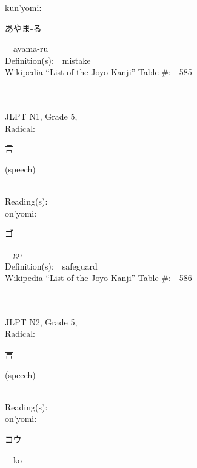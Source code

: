 \begin{multicols}{2}
{\hspace*{1em}}kun'yomi:\ \ \\
{\hspace*{2em}}{\begin{CJK}{UTF8}{min} あやま-る \end{CJK}}\ \ ayama-ru\ \ \\
Definition(s):\ \ mistake \\
Wikipedia ``List of the J\=oy\=o Kanji'' Table \#:\ \ 585 \\
\ \ \\
{\fontsize{34pt}{40pt}  }\ \ \\  %
{JLPT N1, Grade 5, \\Radical:\ \ {\begin{CJK}{UTF8}{min} 言 \end{CJK}} (speech) } \\
Reading(s):\ \ \\
{\hspace*{1em}}on'yomi:\ \ \\
{\hspace*{2em}}{\begin{CJK}{UTF8}{min} ゴ \end{CJK}}\ \ go\ \ \\
Definition(s):\ \ safeguard \\
Wikipedia ``List of the J\=oy\=o Kanji'' Table \#:\ \ 586 \\
\ \ \\
{\fontsize{34pt}{40pt}  }\ \ \\  %
{JLPT N2, Grade 5, \\Radical:\ \ {\begin{CJK}{UTF8}{min} 言 \end{CJK}} (speech) } \\
Reading(s):\ \ \\
{\hspace*{1em}}on'yomi:\ \ \\
{\hspace*{2em}}{\begin{CJK}{UTF8}{min} コウ \end{CJK}}\ \ k\=o\ \ \\

\end{multicols}

